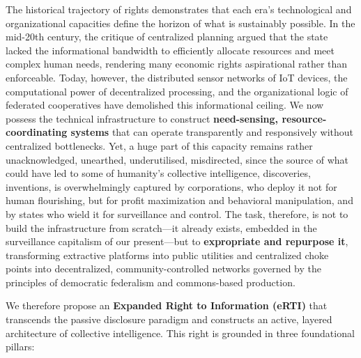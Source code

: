 The historical trajectory of rights demonstrates that each era's
technological and organizational capacities define the horizon of what
is sustainably possible. In the mid-20th century, the critique of
centralized planning argued that the state lacked the informational
bandwidth to efficiently allocate resources and meet complex human
needs, rendering many economic rights aspirational rather than
enforceable. Today, however, the distributed sensor networks of IoT
devices, the computational power of decentralized processing, and the
organizational logic of federated cooperatives have demolished this
informational ceiling. We now possess the technical infrastructure to
construct \textbf{need-sensing, resource-coordinating systems} that can
operate transparently and responsively without centralized bottlenecks.
Yet, a huge part of this capacity remains rather unacknowledged,
unearthed, underutilised, misdirected, since the source of what could
have led to some of humanity's collective intelligence, discoveries,
inventions, is overwhelmingly captured by corporations, who deploy it
not for human flourishing, but for profit maximization and behavioral
manipulation, and by states who wield it for surveillance and control.
The task, therefore, is not to build the infrastructure from
scratch---it already exists, embedded in the surveillance capitalism of
our present---but to \textbf{expropriate and repurpose it}, transforming
extractive platforms into public utilities and centralized choke points
into decentralized, community-controlled networks governed by the
principles of democratic federalism and commons-based production.

We therefore propose an \textbf{Expanded Right to Information (eRTI)}
that transcends the passive disclosure paradigm and constructs an
active, layered architecture of collective intelligence. This right is
grounded in three foundational pillars:


